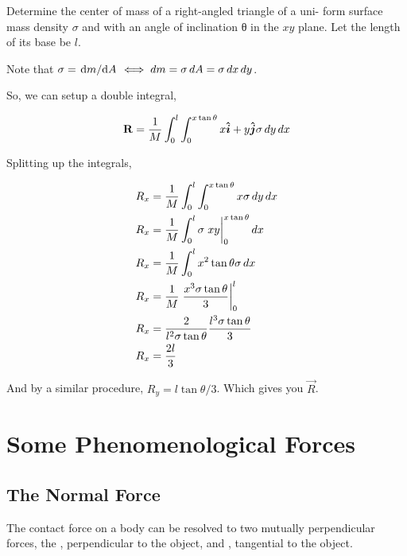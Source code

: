 \begin{example}
    Determine the center of mass of a right-angled triangle of a uni-
    form surface mass density \(\sigma\) and with an angle of inclination θ in the \(xy\)
    plane. Let the length of its base be \(l\).

    \begin{soln}
        Note that \(\sigma = \dv*{m}{A} \iff \mathop{}\!{d}{m} = \sigma\mathop{}\!{d}{A} = \sigma\mathop{}\!{d}{x}\mathop{}\!{d}{y}\).

        So, we can setup a double integral, 

        \begin{equation*}
            \mathbf{R} = \frac{1}{M} \int_{0}^{l} \int_{0}^{x\tan\theta} x {{\boldsymbol{\hat{i}}}} + y{{\boldsymbol{\hat{j}}}} \sigma \mathop{}\!{d}{y} \mathop{}\!{d}{x}
        \end{equation*}

        Splitting up the integrals, 

        \begin{align*}
            R_x &= \frac{1}{M} \int_{0}^{l} \int_{0}^{x\tan\theta} x \sigma \dd{y} \dd{x} \\
            R_x &= \frac{1}{M} \int_{0}^{l} \sigma \eval{xy}_{0}^{x\tan\theta} \dd{x} \\
            R_x &= \frac{1}{M} \int_{0}^{l} x^2 \tan\theta \sigma \dd{x} \\
            R_x &= \frac{1}{M} \eval*{\frac{x^3\sigma\tan\theta}{3}}_{0}^{l} \\
            R_x &= \frac{2}{l^2 \sigma\tan\theta} \frac{l^3\sigma\tan\theta}{3} \\
            R_x &= \frac{2l}{3}
        \end{align*}

        And by a similar procedure, \(R_y = l\tan\theta/3\). Which gives you \(\Vec{R}\).

    \end{soln}
\end{example}

\section{Some Phenomenological Forces}

\subsection{The Normal Force}

The contact force on a body can be resolved to two mutually perpendicular forces, the ,
perpendicular to the object, and , tangential to the object. 

